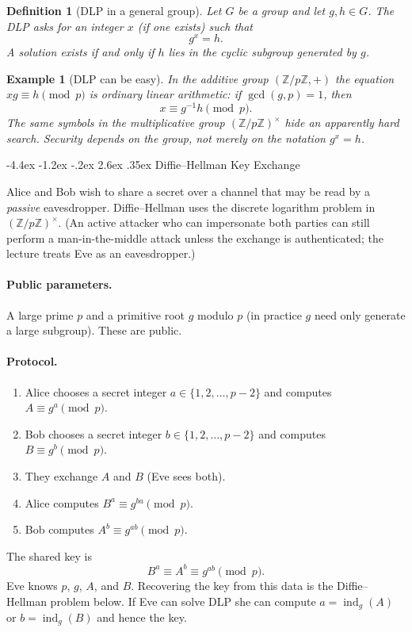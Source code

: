 \documentclass[11pt]{article}
\makeatletter
\renewcommand{\section}{\@startsection{section}{1}{\z@}%
    {-4.4ex \@plus -1.2ex \@minus -.2ex}%
    {2.6ex \@plus .35ex}%
    {\normalfont\Large\bfseries}}
\newtheorem{definition}[theorem]{Definition}
\newtheorem{example}[theorem]{Example}
\theoremstyle{remark}
\DeclareMathOperator{\gcdop}{gcd}
\DeclareMathOperator{\ind}{ind}
\newcommand{\Z}{\mathbb Z}
\newcommand{\units}[1]{\left(\mathbb Z/#1\mathbb Z\right)^\times}
\makeatother
\begin{document}
\begin{definition}[DLP in a general group]
Let $G$ be a group and let $g,h\in G$. The DLP asks for an integer $x$
(if one exists) such that
\[
    g^x = h.
\]
A solution exists if and only if $h$ lies in the cyclic subgroup
generated by $g$.
\end{definition}

\begin{example}[DLP can be easy]
In the \emph{additive} group $(\Z/p\Z,+)$ the equation $xg\equiv h\pmod{p}$
is ordinary linear arithmetic: if $\gcdop(g,p)=1$, then
\[
    x \equiv g^{-1}h \pmod{p}.
\]
The same symbols in the \emph{multiplicative} group $\units{p}$ hide an
apparently hard search. Security depends on the group, not merely on the
notation $g^x=h$.
\end{example}

\section{Diffie--Hellman Key Exchange}

Alice and Bob wish to share a secret over a channel that may be read by
a \emph{passive} eavesdropper. Diffie--Hellman uses the discrete
logarithm problem in $\units{p}$. (An active attacker who can impersonate
both parties can still perform a man-in-the-middle attack unless the
exchange is authenticated; the lecture treats Eve as an eavesdropper.)

\paragraph{Public parameters.}
A large prime $p$ and a primitive root $g$ modulo $p$ (in practice $g$
need only generate a large subgroup). These are public.

\paragraph{Protocol.}
\begin{enumerate}[leftmargin=1.4em]
    \item Alice chooses a secret integer $a\in\{1,2,\ldots,p-2\}$ and
    computes $A\equiv g^a\pmod{p}$.
    \item Bob chooses a secret integer $b\in\{1,2,\ldots,p-2\}$ and
    computes $B\equiv g^b\pmod{p}$.
    \item They exchange $A$ and $B$ (Eve sees both).
    \item Alice computes $B^a\equiv g^{ba}\pmod{p}$.
    \item Bob computes $A^b\equiv g^{ab}\pmod{p}$.
\end{enumerate}
The shared key is
\[
    B^a \equiv A^b \equiv g^{ab} \pmod{p}.
\]
Eve knows $p$, $g$, $A$, and $B$. Recovering the key from this data is
the Diffie--Hellman problem below. If Eve can solve DLP she can compute
$a=\ind_g(A)$ or $b=\ind_g(B)$ and hence the key.
\end{document}

